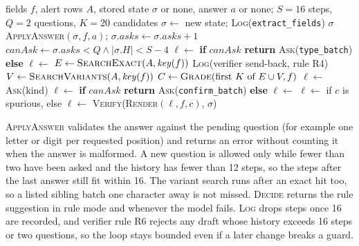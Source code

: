 \begin{algorithm}[!t]
\caption{Bounded investigation of one check (one call)}
\label{alg:loop}
\footnotesize
\begin{algorithmic}[1]
\Require fields $f$, alert rows $A$, stored state $\sigma$ or none, answer $a$ or none; $S{=}16$ steps, $Q{=}2$ questions, $K{=}20$ candidates
 $\sigma \gets$ new state; \textsc{Log}(\texttt{extract\_fields}) \EndIf
{}
   \Return $\sigma$  \EndIf
  \State \textsc{ApplyAnswer}$(\sigma, f, a)$; $\sigma.\mathit{asks} \gets \sigma.\mathit{asks}+1$ 
\EndIf
\State $\mathit{canAsk} \gets \sigma.\mathit{asks} < Q \wedge |\sigma.H| < S-4$
  \State $\ell \gets$ \CANTV
{}
  \State \textbf{if} $\mathit{canAsk}$ \textbf{return} \textsc{Ask}(\texttt{type\_batch}) \textbf{else} $\ell \gets$ \CANTV
\Else
  \State $E \gets \textsc{SearchExact}(A, \mathit{key}(f))$
    \State \textsc{Log}(verifier send-back, rule R4) 
  \EndIf
  \State $V \gets \textsc{SearchVariants}(A, \mathit{key}(f))$ 
  \State $C \gets \textsc{Grade}(\text{first } K \text{ of } E \cup V, f)$
   $\ell \gets$ \CANTV
      \State \Return \textsc{Ask}(kind)
    \EndIf
    \State $\ell \gets$ \CANTV
      \State \textbf{if} $\mathit{canAsk}$ \textbf{return} \textsc{Ask}(\texttt{confirm\_batch}) \textbf{else} $\ell \gets$ \CANTV
    \Else{} $\ell \gets$ \SFAKE{} if $c$ is spurious, else \FLAGGED \EndIf
  \Else{} $\ell \gets$ \NLISTED \EndIf
\EndIf
\State \Return \textsc{Verify}(\textsc{Render}$(\ell, f, c)$, $\sigma$)
\end{algorithmic}
\end{algorithm}

\textsc{ApplyAnswer} validates the answer against the pending question (for example one letter or digit per requested position) and returns an error without counting it when the answer is malformed. A new question is allowed only while fewer than two have been asked and the history has fewer than 12 steps, so the steps after the last answer still fit within 16. The variant search runs after an exact hit too, so a listed sibling batch one character away is not missed. \textsc{Decide} returns the rule suggestion in rule mode and whenever the model fails. \textsc{Log} drops steps once 16 are recorded, and verifier rule R6 rejects any draft whose history exceeds 16 steps or two questions, so the loop stays bounded even if a later change breaks a guard.

